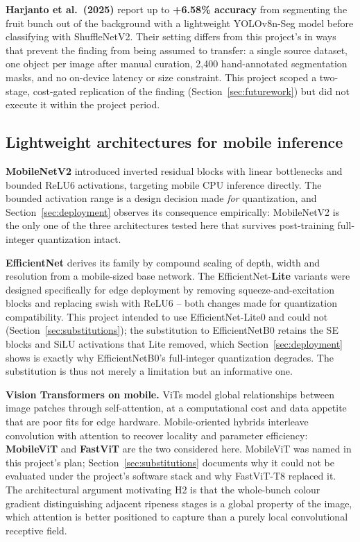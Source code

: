 \documentclass{article}
\begin{document}
\textbf{Harjanto et al.\ (2025)} \citep{harjanto2025yolov8seg} report up to \textbf{+6.58\% accuracy} from
segmenting the fruit bunch out of the background with a lightweight YOLOv8n-Seg model before classifying
with ShuffleNetV2. Their setting differs from this project's in ways that prevent the finding from being
assumed to transfer: a single source dataset, one object per image after manual curation, 2{,}400
hand-annotated segmentation masks, and no on-device latency or size constraint. This project scoped a
two-stage, cost-gated replication of the finding (Section~\ref{sec:futurework}) but did not execute it
within the project period.

\subsection{Lightweight architectures for mobile inference}

\textbf{MobileNetV2} \citep{sandler2018mobilenetv2} introduced inverted residual blocks with linear
bottlenecks and bounded ReLU6 activations, targeting mobile CPU inference directly. The bounded activation
range is a design decision made \textit{for} quantization, and Section~\ref{sec:deployment} observes its
consequence empirically: MobileNetV2 is the only one of the three architectures tested here that survives
post-training full-integer quantization intact.

\textbf{EfficientNet} \citep{tan2019efficientnet} derives its family by compound scaling of depth, width
and resolution from a mobile-sized base network. The EfficientNet-\textbf{Lite} variants were designed
specifically for edge deployment by removing squeeze-and-excitation blocks and replacing swish with ReLU6
-- both changes made for quantization compatibility. This project intended to use EfficientNet-Lite0 and
could not (Section~\ref{sec:substitutions}); the substitution to EfficientNetB0 retains the SE blocks and
SiLU activations that Lite removed, which Section~\ref{sec:deployment} shows is exactly why
EfficientNetB0's full-integer quantization degrades. The substitution is thus not merely a limitation but
an informative one.

\textbf{Vision Transformers on mobile.} ViTs \citep{dosovitskiy2021vit} model global relationships between
image patches through self-attention, at a computational cost and data appetite that are poor fits for
edge hardware. Mobile-oriented hybrids interleave convolution with attention to recover locality and
parameter efficiency: \textbf{MobileViT} \citep{mehta2022mobilevit} and \textbf{FastViT}
\citep{vasu2023fastvit} are the two considered here. MobileViT was named in this project's plan;
Section~\ref{sec:substitutions} documents why it could not be evaluated under the project's software stack
and why FastViT-T8 replaced it. The architectural argument motivating H2 is that the whole-bunch colour
gradient distinguishing adjacent ripeness stages is a global property of the image, which attention is
better positioned to capture than a purely local convolutional receptive field.
\end{document}
